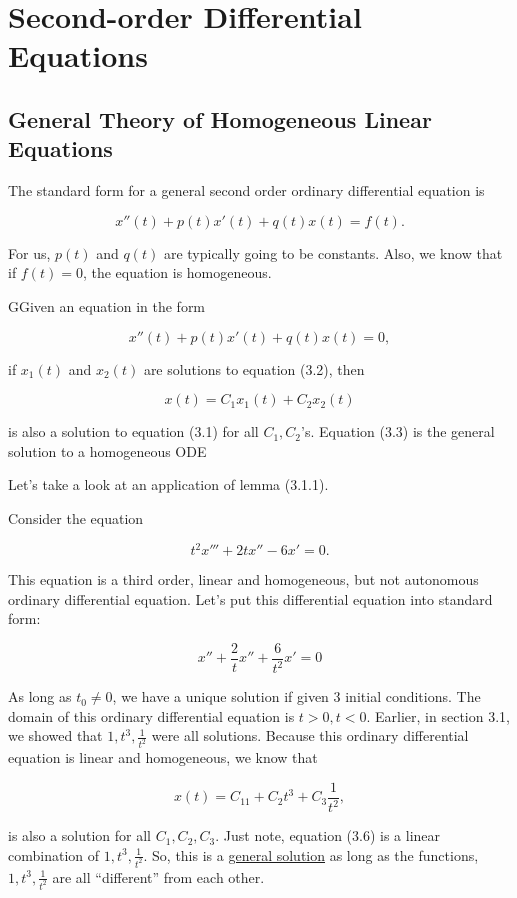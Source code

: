 \newpage
\section{Second-order Differential Equations}

\subsection{General Theory of Homogeneous Linear Equations}
  The standard form for a general second order ordinary differential equation is

  \[
    x''(t)+p(t)x'(t)+q(t)x(t)=f(t).
  \]
  
  For us, $p(t)$ and $q(t)$ are typically going to be constants. Also, we know that if $f(t)=0$, the equation is homogeneous.

  \begin{lemma}
    GGiven an equation in the form 

    \[
      x''(t)+p(t)x'(t)+q(t)x(t)=0,
    \]

    if $x_1(t)$ and $x_2(t)$ are solutions to equation (3.2), then 
    \[\]

    \[
      x(t)=C_1x_1(t)+C_2x_2(t)
    \]

    is also a solution to equation (3.1) for all $C_1,C_2$'s. Equation (3.3) is the general solution to a homogeneous ODE
  \end{lemma}

  Let's take a look at an application of lemma (3.1.1).

  \begin{eg}
    Consider the equation

    \[
    t^2x'''+2tx''-6x'=0.
    \]

    This equation is a third order, linear and homogeneous, but not autonomous ordinary differential equation. Let's put this differential equation into standard form:

    \[
    x''+\frac{2}{t}x''+\frac{6}{t^2}x'=0
    \]

    As long as $t_0\neq0$, we have a unique solution if given 3 initial conditions. The domain of this ordinary differential equation is $t>0,t<0$. Earlier, in section 3.1, we showed that $1,t^3,\frac{1}{t^2}$ were all solutions. Because this ordinary differential equation is linear and homogeneous, we know that 

    \[
    x(t)=C_11+C_2t^3+C_3\frac{1}{t^2},
    \]

    is also a solution for all $C_1,C_2,C_3$. Just note, equation (3.6) is a linear combination of $1,t^3,\frac{1}{t^2}$. So, this is a \underline{general solution} as long as the functions, $1,t^3,\frac{1}{t^2}$ are all “different” from each other.
  \end{eg}

